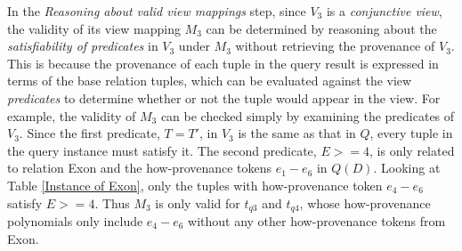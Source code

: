 \begin{example}
In the {\em Reasoning about valid view mappings} step, since $V_3$ is a \textit{conjunctive view}, the validity of its view mapping $M_3$ can be determined by reasoning about the \textit{satisfiability of predicates} in $V_3$ under $M_3$ without retrieving the provenance of $V_3$. This is because the provenance of each tuple in the query result is expressed in terms of the base relation tuples, which can be 
evaluated against the view \textit{predicates} to determine whether or not the tuple would appear in the view. For example, the validity of $M_3$ can be checked simply by examining the predicates of $V_3$. Since the first predicate, $T = T'$, in $V_3$ is the same as that in $Q$, every tuple in the query instance must satisfy it. The second predicate, $E >= 4$, is only related to relation Exon and the how-provenance tokens $e_1-e_6$ in $Q(D)$. Looking at Table \ref{Instance of Exon}, only the tuples with how-provenance token $e_4-e_6$ satisfy $E >= 4$. Thus $M_3$ is only valid for $t_{{q}3}$ and $t_{{q}4}$, whose how-provenance polynomials only include $e_4-e_6$ without any other how-provenance tokens from Exon. 



\end{example}
